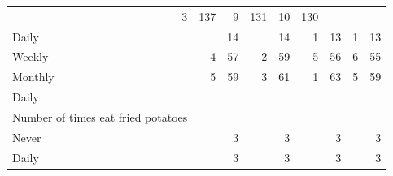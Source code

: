 \documentclass{article}
\begin{document}
\begin{table}[!h]
{\begin{tabular}{lllllllll}
			\multicolumn{1}{r}{3} &
			\multicolumn{1}{r}{137} &
			\multicolumn{1}{r}{9} &
			\multicolumn{1}{r}{131} &
			\multicolumn{1}{r}{10} &
			\multicolumn{1}{r}{130} \\
			\multicolumn{1}{l}{\hspace{5em}Daily} &
			\multicolumn{1}{|r}{} &
			\multicolumn{1}{r}{14} &
			\multicolumn{1}{r}{} &
			\multicolumn{1}{r}{14} &
			\multicolumn{1}{r}{1} &
			\multicolumn{1}{r}{13} &
			\multicolumn{1}{r}{1} &
			\multicolumn{1}{r}{13} \\
			\multicolumn{1}{l}{\hspace{5em}Weekly} &
			\multicolumn{1}{|r}{4} &
			\multicolumn{1}{r}{57} &
			\multicolumn{1}{r}{2} &
			\multicolumn{1}{r}{59} &
			\multicolumn{1}{r}{5} &
			\multicolumn{1}{r}{56} &
			\multicolumn{1}{r}{6} &
			\multicolumn{1}{r}{55} \\
			\multicolumn{1}{l}{\hspace{5em}Monthly} &
			\multicolumn{1}{|r}{5} &
			\multicolumn{1}{r}{59} &
			\multicolumn{1}{r}{3} &
			\multicolumn{1}{r}{61} &
			\multicolumn{1}{r}{1} &
			\multicolumn{1}{r}{63} &
			\multicolumn{1}{r}{5} &
			\multicolumn{1}{r}{59} \\
			\multicolumn{1}{l}{\hspace{3em}Daily} &
			\multicolumn{1}{|r}{} &
			\multicolumn{1}{r}{} &
			\multicolumn{1}{r}{} &
			\multicolumn{1}{r}{} &
			\multicolumn{1}{r}{} &
			\multicolumn{1}{r}{} &
			\multicolumn{1}{r}{} &
			\multicolumn{1}{r}{} \\
			\multicolumn{1}{l}{\hspace{4em}Number of times eat fried potatoes} &
			\multicolumn{1}{|r}{} &
			\multicolumn{1}{r}{} &
			\multicolumn{1}{r}{} &
			\multicolumn{1}{r}{} &
			\multicolumn{1}{r}{} &
			\multicolumn{1}{r}{} &
			\multicolumn{1}{r}{} &
			\multicolumn{1}{r}{} \\
			\multicolumn{1}{l}{\hspace{5em}Never} &
			\multicolumn{1}{|r}{} &
			\multicolumn{1}{r}{3} &
			\multicolumn{1}{r}{} &
			\multicolumn{1}{r}{3} &
			\multicolumn{1}{r}{} &
			\multicolumn{1}{r}{3} &
			\multicolumn{1}{r}{} &
			\multicolumn{1}{r}{3} \\
			\multicolumn{1}{l}{\hspace{5em}Daily} &
			\multicolumn{1}{|r}{} &
			\multicolumn{1}{r}{3} &
			\multicolumn{1}{r}{} &
			\multicolumn{1}{r}{3} &
			\multicolumn{1}{r}{} &
			\multicolumn{1}{r}{3} &
			\multicolumn{1}{r}{} &
			\multicolumn{1}{r}{3} \\

\end{tabular}}
\end{table}
\end{document}
